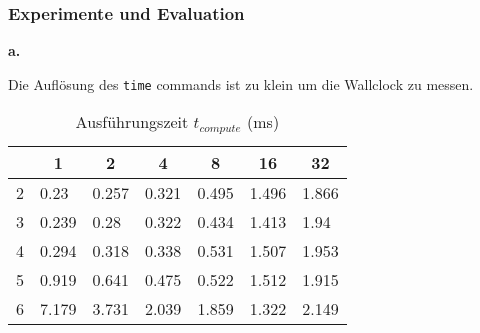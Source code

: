 \documentclass[12pt]{article}
\begin{document}
\subsubsection{Experimente und Evaluation}

\noindent \textbf{a.}

Die Auflösung des \texttt{time} commands ist zu klein um die Wallclock zu messen.
\begin{table}[htbp]
	\centering
	\caption[Ausführungszeit $t_{compute}$ (\si{\second})]{Ausführungszeit $t_{compute}$ (\si{\milli\second})}
	\begin{tabular}{c|l|l|l|l|l|l}
		\hline
		\cellcolor{gray!40}\textbf{\diagbox{n}{Threads}} & \multicolumn{1}{c}{\cellcolor{gray!40}\textbf{1}} & \multicolumn{1}{c}{\cellcolor{gray!40}\textbf{2}} & \multicolumn{1}{c}{\cellcolor{gray!40}\textbf{4}} &
		\multicolumn{1}{c}{\cellcolor{gray!40}\textbf{8}} &
		\multicolumn{1}{c}{\cellcolor{gray!40}\textbf{16}} &
		\multicolumn{1}{c}{\cellcolor{gray!40}\textbf{32}} \\
		\hline\hline
		2 & 0.23  & 0.257 & 0.321 & 0.495 & 1.496 & 1.866 \\
		3 & 0.239 & 0.28  & 0.322 & 0.434 & 1.413 & 1.94  \\
		4 & 0.294 & 0.318 & 0.338 & 0.531 & 1.507 & 1.953 \\
		5 & 0.919 & 0.641 & 0.475 & 0.522 & 1.512 & 1.915 \\
		6 & 7.179 & 3.731 & 2.039 & 1.859 & 1.322 & 2.149 \\
	\end{tabular}
	\label{tab:tcomp}
\end{table}

\end{document}
